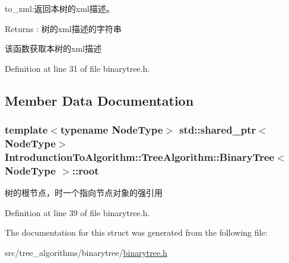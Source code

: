 to\+\_\+xml\+:返回本树的{\ttfamily xml}描述。 

\begin{DoxyReturn}{Returns}
\+: 树的{\ttfamily xml}描述的字符串
\end{DoxyReturn}
该函数获取本树的{\ttfamily xml}描述 

Definition at line 31 of file binarytree.\+h.



\subsection{Member Data Documentation}
\hypertarget{struct_introdunction_to_algorithm_1_1_tree_algorithm_1_1_binary_tree_acd08e406313d41bb0dd2e17aabde8482}{}
\subsubsection[{root}]{\setlength{\rightskip}{0pt plus 5cm}template$<$typename Node\+Type$>$ std\+::shared\+\_\+ptr$<$Node\+Type$>$ {\bf Introdunction\+To\+Algorithm\+::\+Tree\+Algorithm\+::\+Binary\+Tree}$<$ Node\+Type $>$\+::root}\label{struct_introdunction_to_algorithm_1_1_tree_algorithm_1_1_binary_tree_acd08e406313d41bb0dd2e17aabde8482}
树的根节点，时一个指向节点对象的强引用 

Definition at line 39 of file binarytree.\+h.



The documentation for this struct was generated from the following file\+:\begin{DoxyCompactItemize}
\item 
src/tree\+\_\+algorithms/binarytree/\hyperlink{binarytree_8h}{binarytree.\+h}\end{DoxyCompactItemize}
